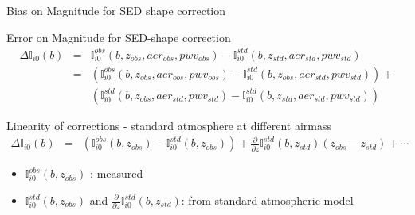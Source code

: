 \documentclass{beamer}
\begin{document}
\begin{frame}{Bias on Magnitude for SED shape correction}
\begin{block}{Error on Magnitude for SED-shape correction}
\begin{eqnarray}
\Delta \mathbb{I}_{i0}(b) & = &  \mathbb{I}_{i0}^{obs}(b,z_{obs},aer_{obs},pwv_{obs}) - \mathbb{I}_{i0}^{std}(b,z_{std},aer_{std},pwv_{std}) \nonumber \\
& = & \left(\mathbb{I}_{i0}^{obs}(b,z_{obs},aer_{obs},pwv_{obs}) - \mathbb{I}_{i0}^{std}(b,z_{obs},aer_{std},pwv_{std})\right) +  \nonumber \\
& & \left(\mathbb{I}_{i0}^{std}(b,z_{obs},aer_{std},pwv_{std}) - \mathbb{I}_{i0}^{std}(b,z_{std},aer_{std},pwv_{std})\right)  \nonumber 
\end{eqnarray}
\end{block}

\begin{alertblock}{Linearity of corrections - standard atmosphere at different airmass}
\begin{eqnarray}
\Delta \mathbb{I}_{i0}(b) & = & \left(\mathbb{I}_{i0}^{obs}(b,z_{obs}) - \mathbb{I}_{i0}^{std}(b,z_{obs})\right) + \frac{\partial}{\partial z}\mathbb{I}_{i0}^{std}(b,z_{std})(z_{obs}-z_{std}) + \cdots \nonumber
\end{eqnarray}
\end{alertblock}
\begin{itemize}
\item $\mathbb{I}_{i0}^{obs}(b,z_{obs})$ : measured
\item $\mathbb{I}_{i0}^{std}(b,z_{obs})$ and $\frac{\partial}{\partial z}\mathbb{I}_{i0}^{std}(b,z_{std})$: from standard atmospheric model
\end{itemize}
\end{frame}
\end{document}
